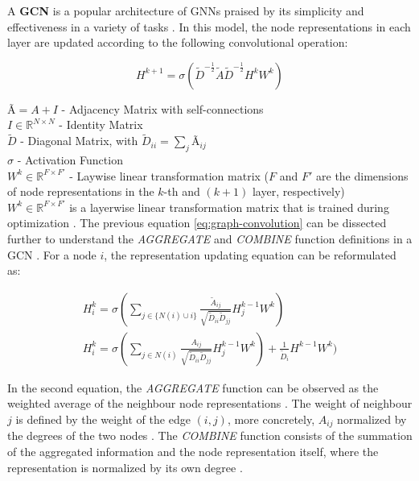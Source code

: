 A \textbf{\ac{GCN}} \cite{kipfSemiSupervisedClassificationGraph2017} is a popular architecture of \acp{GNN} praised by its simplicity and effectiveness in a variety of tasks \cite{liuIntroductionGraphNeural2020, tangGraphNeuralNetworks2022}. In this model, the node representations in each layer are updated according to the following convolutional operation:

\begin{equation} \label{eq:graph-convolution}
	H^{k+1} = \sigma(\tilde{D}^{-\frac{1}{2}} \tilde{A} \tilde{D}^{-\frac{1}{2}} H^k W^k)  
\end{equation}

$Ã = A + I$ - Adjacency Matrix with self-connections \\
$I \in \mathbb{R}^{N \times N}$ - Identity Matrix \\
$\tilde{D}$ - Diagonal Matrix,  with $\tilde{D}_{ii} = \sum_j Ã_{ij}$ \\
$\sigma$ - Activation Function \\
$W^k \in \mathbb{R}^{F \times F'}$ - Laywise linear transformation matrix ($F$ and $F'$ are the dimensions of node representations in the $k$-th and $(k + 1)$ layer, respectively) \\

$W^k \in \mathbb{R}^{F \times F'}$ is a layerwise linear transformation matrix that is trained during optimization \cite{tangGraphNeuralNetworks2022}. The previous equation \ref{eq:graph-convolution} can be dissected further to understand the \textit{AGGREGATE} and \textit{COMBINE} function definitions in a \ac{GCN} \cite{tangGraphNeuralNetworks2022}. For a node $i$, the representation updating equation can be reformulated as:

\begin{gather}
	H^k_i = \sigma(\sum_{j \in \{N(i) \cup i\}} \frac{\tilde{A}_{ij}}{\sqrt{\tilde{D}_{ii} \tilde{D}_{jj}}} H^{k-1}_j W^k) \\
	H^k_i = \sigma(\sum_{j \in N(i)} \frac{A_{ij}}{\sqrt{\tilde{D}_{ii} \tilde{D}_{jj}}} H^{k-1}_j W^k) + \frac{1}{\tilde{D}_i} H^{k-1} W^k)
\end{gather}

In the second equation, the \textit{AGGREGATE} function can be observed as the weighted average of the neighbour node representations \cite{tangGraphNeuralNetworks2022}. The weight of neighbour $j$ is defined by the weight of the edge $(i,j)$, more concretely, $A_{ij}$ normalized by the degrees of the two nodes \cite{tangGraphNeuralNetworks2022}. The \textit{COMBINE} function consists of the summation of the aggregated information and the node representation itself, where the representation is normalized by its own degree \cite{tangGraphNeuralNetworks2022}.


